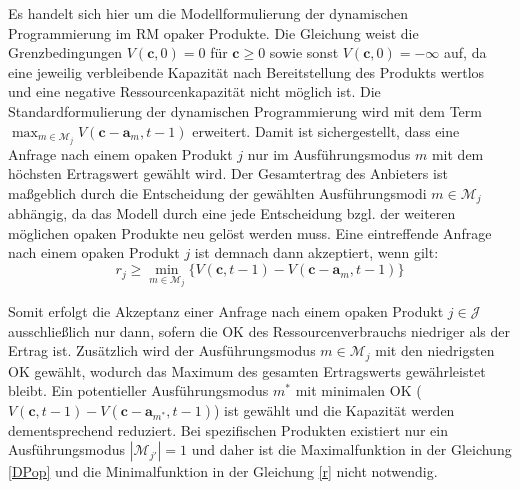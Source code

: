 Es handelt sich hier um die Modellformulierung der dynamischen Programmierung im RM opaker Produkte. Die Gleichung weist die Grenzbedingungen $V(\textbf{c},0)=0$ für $\textbf{c}\ge0$ sowie sonst $V(\textbf{c},0)=-\infty$ auf, da eine jeweilig verbleibende Kapazität nach Bereitstellung des Produkts wertlos und eine negative Ressourcenkapazität nicht möglich ist. Die Standardformulierung der dynamischen Programmierung wird mit dem Term $\max_{m\in\mathcal{M}_{j}}V(\textbf{c}-\textbf{a}_{m},t-1)$ erweitert. Damit ist sichergestellt, dass eine Anfrage nach einem opaken Produkt $j$ nur im Ausführungsmodus $m$ mit dem höchsten Ertragswert gewählt wird. Der Gesamtertrag des Anbieters ist maßgeblich durch die Entscheidung der gewählten Ausführungs\-modi $m\in\mathcal{M}_{j}$ abhängig, da das Modell durch eine jede Entscheidung bzgl. der weiteren möglichen opaken Produkte neu gelöst werden muss. Eine eintreffende Anfrage nach einem opaken Produkt $j$ ist demnach dann akzeptiert, wenn gilt:
\begin{equation}\label{r}
r_{j}\ge\min_{m\in\mathcal{M}_{j}}\bigl\{V(\textbf{c},t-1)-V(\textbf{c}-\textbf{a}_{m},t-1)\bigr\}
\end{equation}


Somit erfolgt die Akzeptanz einer Anfrage nach einem opaken Produkt $j\in\mathcal{J}$ ausschließlich nur dann, sofern die OK des Ressourcenverbrauchs niedriger als der Ertrag ist. Zusätzlich wird der Ausführungsmodus $m\in\mathcal{M}_{j}$ mit den niedrigsten OK gewählt, wodurch das Maximum des gesamten Ertragswerts gewährleistet bleibt. Ein potentieller Ausführungs\-modus $m^{*}$ mit minimalen OK ($V(\textbf{c},t-1)-V(\textbf{c}-\textbf{a}_{m^{*}},t-1)$) ist gewählt und die Kapazität werden dementsprechend reduziert. Bei spezifischen Produkten existiert nur ein Ausführungsmodus $|\mathcal{M}_{j'}|=1$ und daher ist die Maximalfunktion in der Gleichung \eqref{DPop} und die Minimalfunktion in der Gleichung \eqref{r} nicht notwendig.